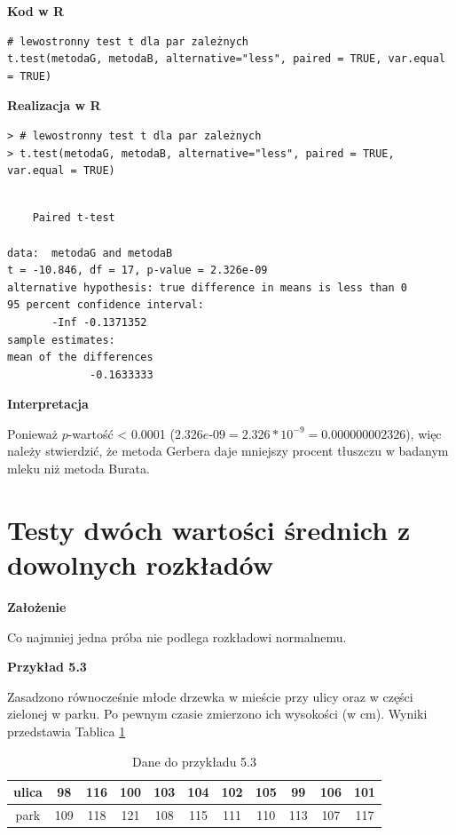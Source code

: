 \documentclass[12pt,B5paper,]{book}
\begin{document}
\vspace{0.8cm} \textbf{Kod w R}

\begin{verbatim}
# lewostronny test t dla par zależnych
t.test(metodaG, metodaB, alternative="less", paired = TRUE, var.equal = TRUE)
\end{verbatim}

\vspace{0.8cm} \textbf{Realizacja w R}

\begin{verbatim}
> # lewostronny test t dla par zależnych
> t.test(metodaG, metodaB, alternative="less", paired = TRUE, var.equal = TRUE)
\end{verbatim}

\begin{verbatim}

    Paired t-test

data:  metodaG and metodaB
t = -10.846, df = 17, p-value = 2.326e-09
alternative hypothesis: true difference in means is less than 0
95 percent confidence interval:
       -Inf -0.1371352
sample estimates:
mean of the differences 
             -0.1633333 
\end{verbatim}

\vspace{0.8cm} \textbf{Interpretacja}

Ponieważ \(p\)-wartość \textless{} 0.0001
(\(2.326e\)-\(09=2.326*10^{-9}=0.000000002326\)), więc należy
stwierdzić, że metoda Gerbera daje mniejszy procent tłuszczu w badanym
mleku niż metoda Burata.

\section{Testy dwóch wartości średnich z dowolnych
rozkładów}\label{testy-dwoch-wartosci-srednich-z-dowolnych-rozkadow}

\textbf{Założenie}

Co najmniej jedna próba nie podlega rozkładowi normalnemu.

\vspace{0.8cm}

\textbf{Przykład 5.3}

Zasadzono równocześnie młode drzewka w mieście przy ulicy oraz w części
zielonej w parku. Po pewnym czasie zmierzono ich wysokości (w cm).
Wyniki przedstawia Tablica \ref{przyklad5}

\begin{table}[H]
\centering
\caption{Dane do przykładu 5.3}
\label{przyklad5}
\begin{tabular}{ccccccccccc}
ulica & 98& 116& 100& 103& 104& 102& 105& 99& 106& 101 \\ \hline
park  & 109& 118& 121& 108& 115& 111& 110& 113& 107& 117 \\ 
\end{tabular}
\end{table}
\end{document}
